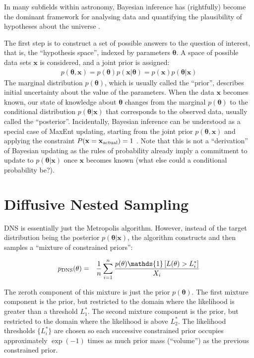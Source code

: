 \documentclass[
  ,final            %
  ]
  {aipproc}
\newcommand{\pars}{\boldsymbol{\theta}}
\newcommand{\data}{\mathbf{x}}
\begin{document}
In many subfields within astronomy, Bayesian inference has (rightfully)
become the dominant framework for analysing data and quantifying the
plausibility of hypotheses about the universe \citep[e.g.][]{refs}.


The first step is to construct a set of possible answers to the question of
interest, that is, the ``hypothesis space'', indexed by parameters $\pars$.
A space of possible data sets $\data$ is considered, and a joint prior is
assigned:
\begin{eqnarray}
p(\pars, \data) = p(\pars) p(\data | \pars) = p(\data)p(\pars | \data)
\end{eqnarray}
The marginal distribution $p(\pars)$, which is usually called the ``prior'',
describes initial uncertainty about the value of the parameters. When the
data $\data$ becomes known, our state of knowledge about $\pars$ changes
from the marginal $p(\pars)$ to the conditional distribution $p(\pars | \data)$
that corresponds to the observed data, usually called the ``posterior''.
Incidentally, Bayesian inference can be understood as a special case of
MaxEnt updating, starting from the joint prior $p(\pars, \data)$ and applying
the constraint $P(\data = \data_{\rm actual}) = 1$ \citep{caticha}. Note that
this is not a ``derivation'' of Bayesian updating as the rules of probability
already imply a commitment to update to $p(\pars | \data)$ once $\data$ becomes
known (what else could a conditional probability be?).

\section{Diffusive Nested Sampling}
DNS is essentially just the Metropolis algorithm. However, instead of the
target distribution being the posterior $p(\pars|\data)$, the algorithm
constructs and then samples a ``mixture of constrained priors'':

\begin{eqnarray}
p_{\rm DNS}(\theta) &=& \frac{1}{n}\sum_{i=1}^n
\frac{p(\theta)\mathds{1}\left[L(\theta) > L^*_i\right]}{X_i}
\end{eqnarray}

The zeroth component of this mixture is just the prior $p(\pars)$. The first
mixture component is the prior, but restricted to the domain where the
likelihood is greater than a threshold $L^*_1$. The second mixture component
is the prior, but restricted to the domain where the likelihood is above
$L^*_2$. The likelihood thresholds $\{ L^*_i \}$ are chosen so each
successive constrained prior occupies approximately $\exp(-1)$ times as much
prior mass (``volume'') as the previous constrained prior.
\end{document}
